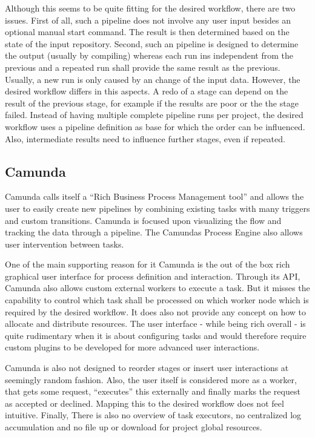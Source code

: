 Although this seems to be quite fitting for the desired workflow, there are two issues.
First of all, such a pipeline does not involve any user input besides an optional manual start command.
The result is then determined based on the state of the input repository.
Second, such an pipeline is designed to determine the output (usually by compiling) whereas each run ins independent from the previous and a repeated run shall provide the same result as the previous.
Usually, a new run is only caused by an change of the input data.
However, the desired workflow differs in this aspects.
A redo of a stage can depend on the result of the previous stage, for example if the results are poor or the the stage failed.
Instead of having multiple complete pipeline runs per project, the desired workflow uses a pipeline definition as base for which the order can be influenced.
Also, intermediate results need to influence further stages, even if repeated.


\subsection{Camunda}

Camunda\cite{camunda:main} calls itself a \enquote{Rich Business Process Management tool} and allows the user to easily create new pipelines by combining existing tasks with many triggers and custom transitions. %
Camunda is focused upon visualizing the flow and tracking the data through a pipeline. %
The Camundas Process Engine\cite{camunda:process_engine_api} also allows user intervention between tasks.

One of the main supporting reason for it Camunda is the out of the box rich graphical user interface for process definition and interaction.
Through its API\cite{camunda:rest_api_reference}, Camunda also allows custom external workers to execute a task.
But it misses the capability to control which task shall be processed on which worker node which is required by the desired workflow.
It does also not provide any concept on how to allocate and distribute resources.
The user interface - while being rich overall - is quite rudimentary when it is about configuring tasks and would therefore require custom plugins to be developed for more advanced user interactions.

Camunda is also not designed to reorder stages or insert user interactions at seemingly random fashion.
Also, the user itself is considered more as a worker, that gets some request, \enquote{executes} this externally and finally marks the request as accepted or declined.
Mapping this to the desired workflow does not feel intuitive.
Finally, There is also no overview of task executors, no centralized log accumulation and no file up or download for project global resources.


